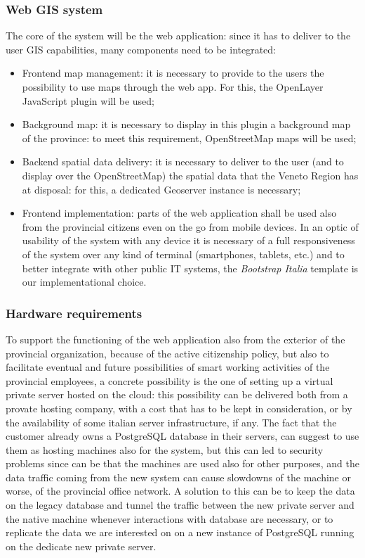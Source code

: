 \subsubsection{Web GIS system}
The core of the system will be the web application: since it has to deliver to the user GIS capabilities, many components need to be integrated:
\begin{itemize}
    \item Frontend map management: it is necessary to provide to the users the possibility to use maps through the web app. For this, the OpenLayer JavaScript plugin will be used;
    \item Background map: it is necessary to display in this plugin a background map of the province: to meet this requirement, OpenStreetMap maps will be used;
    \item Backend spatial data delivery: it is necessary to deliver to the user (and to display over the OpenStreetMap) the spatial data that the Veneto Region has at disposal: for this, a dedicated Geoserver instance is necessary;
    \item Frontend implementation: parts of the web application shall be used also from the provincial citizens even on the go from mobile devices. In an optic of usability of the system with any device it is necessary of a full responsiveness of the system over any kind of terminal (smartphones, tablets, etc.) and to better integrate with other public IT systems, the \textit{Bootstrap Italia} template is our implementational choice.
\end{itemize}

\subsubsection{Hardware requirements}
To support the functioning of the web application also from the exterior of the provincial organization, because of the active citizenship policy, but also to facilitate eventual and future possibilities of smart working activities of the provincial employees, a concrete possibility is the one of setting up a virtual private server hosted on the cloud: this possibility can be delivered both from a provate hosting company, with a cost that has to be kept in consideration, or by the availability of some italian server infrastructure, if any.
The fact that the customer already owns a PostgreSQL database in their servers, can suggest to use them as hosting machines also for the system, but this can led to security problems since can be that the machines are used also for other purposes, and the data traffic coming from the new system can cause slowdowns of the machine or worse, of the provincial office network. A solution to this can be to keep the data on the legacy database and tunnel the traffic between the new private server and the native machine whenever interactions with database are necessary, or to replicate the data we are interested on on a new instance of PostgreSQL running on the dedicate new private server.

